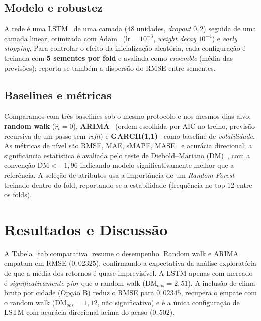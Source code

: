 \documentclass[12pt]{article}
\begin{document}
\subsection{Modelo e robustez}

A rede é uma LSTM~\cite{hochreiter1997lstm} de uma camada (48 unidades, \emph{dropout}
$0{,}2$) seguida de uma camada linear, otimizada com Adam~\cite{kingma2015adam}
($\text{lr}=10^{-3}$, \emph{weight decay} $10^{-4}$) e \emph{early stopping}. Para controlar o efeito da inicialização aleatória, cada
configuração é treinada com \textbf{5 sementes por fold} e avaliada como \emph{ensemble}
(média das previsões); reporta-se também a dispersão do RMSE entre sementes.

\subsection{Baselines e métricas}

Comparamos com três baselines sob o mesmo protocolo e nos mesmos dias-alvo:
\textbf{random walk} ($\hat{r}_t = 0$), \textbf{ARIMA}~\cite{box1976time} (ordem
escolhida por AIC no treino, previsão recursiva de um passo sem \emph{refit}) e
\textbf{GARCH(1,1)}~\cite{bollerslev1986generalized} como baseline de
\emph{volatilidade}. As métricas de nível são RMSE, MAE, sMAPE, MASE~\cite{hyndman2006another}
e acurácia direcional; a significância estatística é avaliada pelo teste de
Diebold--Mariano (DM)~\cite{diebold1995comparing}, com a convenção $\mathrm{DM}<-1{,}96$
indicando modelo significativamente melhor que a referência. A seleção de atributos usa
a importância de um \emph{Random Forest}~\cite{breiman2001random} treinado dentro do
fold, reportando-se a estabilidade (frequência no top-12 entre os folds).

\section{Resultados e Discussão}

A Tabela~\ref{tab:comparativa} resume o desempenho. Random walk e ARIMA empatam em RMSE
($0{,}02325$), confirmando a expectativa da análise exploratória de que a média dos
retornos é quase imprevisível. A LSTM apenas com mercado é \emph{significativamente
pior} que o random walk ($\mathrm{DM}_{oos}=2{,}51$). A inclusão de clima bruto por
cidade (Opção B) reduz o RMSE para $0{,}02345$, recupera o empate com o random walk
($\mathrm{DM}_{oos}=1{,}12$, não significativo) e é a única configuração de LSTM com
acurácia direcional acima do acaso ($0{,}502$).
\end{document}
